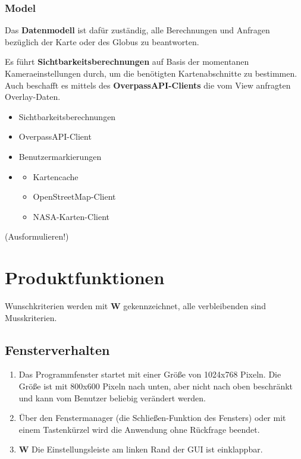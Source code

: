 \documentclass[10pt]{scrreprt}
\begin{document}
\subsection*{Model}
Das \textbf{Datenmodell} ist dafür zuständig, alle Berechnungen und Anfragen bezüglich der Karte oder des Globus zu beantworten.

Es führt \textbf{Sichtbarkeitsberechnungen} auf Basis der momentanen Kameraeinstellungen durch, um die benötigten Kartenabschnitte zu bestimmen.
Auch beschafft es mittels des \textbf{OverpassAPI-Clients} die vom View anfragten Overlay-Daten.

\begin{itemize}
\item Sichtbarkeitsberechnungen
\item OverpassAPI-Client
\item Benutzermarkierungen
\item \begin{itemize}
\item Kartencache
\item OpenStreetMap-Client
\item NASA-Karten-Client
\end{itemize}
\end{itemize}
\vspace{1cm}(Ausformulieren!)


\chapter{Produktfunktionen}

\renewcommand{\labelenumi}{\textbf{/F\numprint{\theenumi}0/}}

\newcommand{\W}{\textbf{W }}
Wunschkriterien werden mit \W  gekennzeichnet, alle verbleibenden sind Musskriterien.

\section{Fensterverhalten}
\begin{enumerate}[leftmargin=2cm]
\item Das Programmfenster startet mit einer Größe von 1024x768 Pixeln. Die Größe ist mit 800x600 Pixeln nach unten, aber nicht nach oben beschränkt und kann vom Benutzer beliebig  verändert werden.
\item Über den Fenstermanager (die Schließen-Funktion des Fensters) oder mit einem Tastenkürzel wird die Anwendung ohne Rückfrage beendet.
\item \W Die Einstellungsleiste am linken Rand der GUI ist einklappbar.
\end{enumerate}
\end{document}
